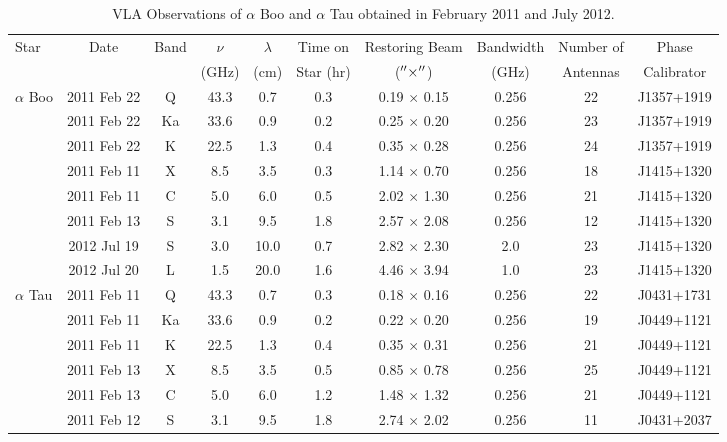 \begin{landscape}
\begin{table}[!ht]
\begin{center}
\caption[VLA Observations of $\alpha$ Boo and $\alpha$ Tau.]
{VLA Observations of $\alpha$ Boo and $\alpha$ Tau obtained in February 2011 and July 2012.}
\begin{tabular}{lccccccccc}
\hline
\hline
\rule{0pt}{2.5ex}Star & Date & Band & $\nu$	& $\lambda$& Time on& Restoring Beam			& Bandwidth & Number of&Phase\\
	 & 		&  & (GHz)		& (cm)		& Star (hr)		  & ($^{\prime\prime} \times ^{\prime\prime}$)& (GHz)		& Antennas&Calibrator\\
\hline
\rule{0pt}{2.5ex} $\alpha$ Boo 	& 2011 Feb 22 & Q	& 43.3 & 0.7		& 0.3 	&0.19 $\times$ 0.15& 0.256	&22& J1357+1919  \\
				& 2011 Feb 22 & Ka	& 33.6 & 0.9		& 0.2 	&0.25 $\times$ 0.20& 0.256 	&23&J1357+1919  \\
				& 2011 Feb 22 & K	& 22.5 & 1.3		& 0.4	&0.35 $\times$ 0.28& 0.256 	&24&J1357+1919  \\
				& 2011 Feb 11 & X	& 8.5  & 3.5		& 0.3 	&1.14 $\times$ 0.70& 0.256 	&18&J1415+1320  \\
				& 2011 Feb 11 & C	& 5.0  & 6.0 		& 0.5	&2.02 $\times$ 1.30& 0.256 	&21& J1415+1320 \\
				& 2011 Feb 13 & S	& 3.1  & 9.5 		& 1.8 	&2.57 $\times$ 2.08& 0.256 	&12& J1415+1320 \\
				& 2012 Jul 19 & S	& 3.0  & 10.0 		& 0.7 	&2.82 $\times$ 2.30& 2.0		&23& J1415+1320 \\
				& 2012 Jul 20 & L	& 1.5  & 20.0		& 1.6 	&4.46 $\times$ 3.94& 1.0		&23& J1415+1320 \\
\hline
\rule{0pt}{2.5ex}  $\alpha$ Tau	& 2011 Feb 11 & Q	& 43.3 & 0.7 		& 0.3 	&0.18 $\times$ 0.16& 0.256 	&22&  J0431+1731\\
				& 2011 Feb 11 & Ka	& 33.6 & 0.9 		& 0.2 	&0.22 $\times$ 0.20& 0.256 	&19&  J0449+1121\\
				& 2011 Feb 11 & K	& 22.5 & 1.3 		& 0.4 	&0.35 $\times$ 0.31& 0.256 	&21&  J0449+1121\\
				& 2011 Feb 13 & X	&  8.5 & 3.5 		& 0.5	&0.85 $\times$ 0.78& 0.256 	&25&  J0449+1121\\
				& 2011 Feb 13 & C	&  5.0 & 6.0 		& 1.2	&1.48 $\times$ 1.32& 0.256 	&21&  J0449+1121\\
				& 2011 Feb 12 & S	&  3.1 & 9.5 		& 1.8 	&2.74 $\times$ 2.02& 0.256 	&11&  J0431+2037\\ 
\hline
\end{tabular}
\label{tab:1}
\end{center}
\end{table}
\end{landscape}

